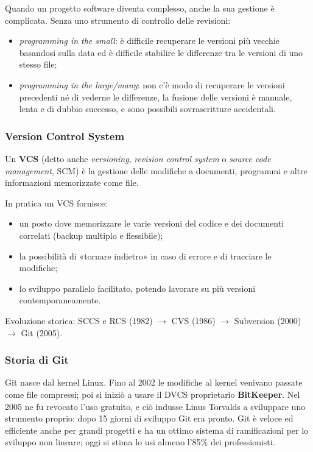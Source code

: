 \documentclass[a4paper,12pt]{article}
\begin{document}
Quando un progetto software diventa complesso, anche la sua gestione è complicata.
Senza uno strumento di controllo delle revisioni:
\begin{itemize}
  \item \emph{programming in the small}: è difficile recuperare le versioni più vecchie
        basandosi sulla data ed è difficile stabilire le differenze tra le versioni di
        uno stesso file;
  \item \emph{programming in the large/many}: non c'è modo di recuperare le versioni
        precedenti né di vederne le differenze, la fusione delle versioni è manuale,
        lenta e di dubbio successo, e sono possibili sovrascritture accidentali.
\end{itemize}

\subsubsection{Version Control System}

Un \textbf{VCS} (detto anche \emph{versioning}, \emph{revision control system} o
\emph{source code management}, SCM) è la gestione delle modifiche a documenti, programmi
e altre informazioni memorizzate come file.

In pratica un VCS fornisce:
\begin{itemize}
  \item un posto dove memorizzare le varie versioni del codice e dei documenti correlati
        (backup multiplo e flessibile);
  \item la possibilità di «tornare indietro» in caso di errore e di tracciare le
        modifiche;
  \item lo sviluppo parallelo facilitato, potendo lavorare su più versioni
        contemporaneamente.
\end{itemize}

Evoluzione storica: SCCS e RCS (1982) $\rightarrow$ CVS (1986) $\rightarrow$
Subversion (2000) $\rightarrow$ Git (2005).

\subsubsection{Storia di Git}

Git nasce dal kernel Linux. Fino al 2002 le modifiche al kernel venivano passate come
file compressi; poi si iniziò a usare il DVCS proprietario \textbf{BitKeeper}. Nel 2005
ne fu revocato l'uso gratuito, e ciò indusse Linus Torvalds a sviluppare uno strumento
proprio: dopo 15 giorni di sviluppo Git era pronto. Git è veloce ed efficiente anche per
grandi progetti e ha un ottimo sistema di ramificazioni per lo sviluppo non lineare;
oggi si stima lo usi almeno l'85\% dei professionisti.
\end{document}
